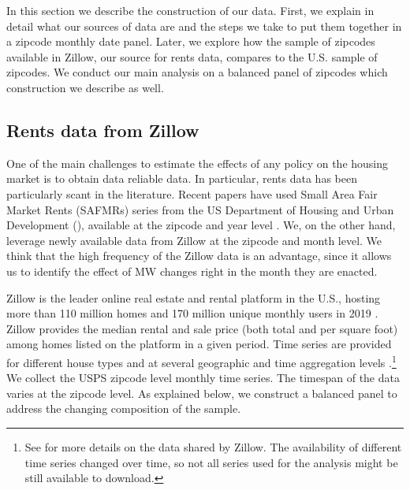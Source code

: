 
In this section we describe the construction of our data. First, we explain in detail
what our sources of data are and the steps we take to put them together in a zipcode
monthly date panel. Later, we explore how the sample of zipcodes available in Zillow, 
our source for rents data, compares to the U.S. sample of zipcodes. We conduct our 
main analysis on a balanced panel of zipcodes which construction we describe as well.

\subsection{Rents data from Zillow}

One of the main challenges to estimate the effects of any policy on the housing market
is to obtain data reliable data. In particular, rents data has been particularly scant
in the literature. Recent papers have used Small Area Fair Market Rents 
(SAFMRs) series from the US Department of Housing and Urban Development (\citeyear{hud}), 
available at the zipcode and year level \parencite{Tidemann2018, Yamagishi2019}. We, 
on the other hand, leverage newly available data from Zillow at the zipcode and month 
level. We think that the high frequency of the Zillow data is an advantage, since it 
allows us to identify the effect of MW changes right in the month they are enacted.

Zillow is the leader online real estate and rental platform in the U.S., hosting more 
than 110 million homes and 170 million unique monthly users in 2019 
\parencite{ZillowFacts}. Zillow provides the median rental and sale price (both 
total and per square foot) among homes listed on the platform in a given period. Time 
series are provided for different house types and at several geographic and time 
aggregation levels \parencite{ZillowData}.\footnote{See \textcite{ZillowData} for 
	more details on the data shared by Zillow. The availability of different time 
	series changed over time, so not all series used for the analysis might be still 
	available to download.} 
We collect the USPS zipcode level monthly time series. The timespan of the data 
varies at the zipcode level. As explained below, we construct a balanced panel to
address the changing composition of the sample.

